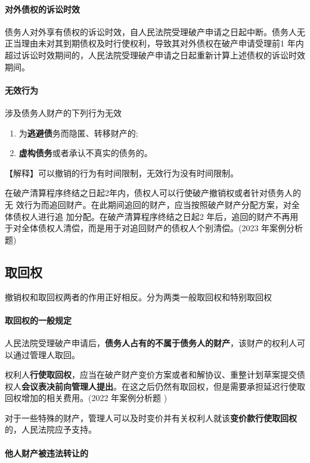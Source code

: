 \documentclass[UTF8,12pt]{ctexart}
\numberwithin{equation}{section} %
\numberwithin{figure}{section}
\numberwithin{table}{section}
\begin{document}
	
	\paragraph{对外债权的诉讼时效}
	债务人对外享有债权的诉讼时效，自人民法院受理破产申请之日起中断。债务人无正当理由未对其到期债权及时行使权利，导致其对外债权在破产申请受理前1 年内超过诉讼时效期间的，人民法院受理破产申请之日起重新计算上述债权的诉讼时效期间。
	
	\paragraph{无效行为}
	涉及债务人财产的下列行为无效
	\begin{enumerate}
		\item 为\textbf{逃避债}务而隐匿、转移财产的; 
		
		\item \textbf{虚构债务}或者承认不真实的债务的。
	\end{enumerate}
	【解释】可以撤销的行为有时间限制，无效行为没有时间限制。
	
	在破产清算程序终结之日起2年内，债权人可以行使破产撤销权或者针对债务人的无 效行为而追回财产。在此期间追回的财产，应当按照破产财产分配方案，对全体债权人进行追 加分配。在破产清算程序终结之日起2 年后，追回的财产不再用于对全体债权人清偿，而是用于对追回财产的债权人个别清偿。(2023 年案例分析题)
	
	\subsection{取回权}
	撤销权和取回权两者的作用正好相反。分为两类一般取回权和特别取回权
	\paragraph{取回权的一般规定}
	人民法院受理破产申请后，\textbf{债务人占有的不属于债务人的财产}，该财产的权利人可以通过管理人取回。
	
	权利人\textbf{行使取回权}，应当在破产财产变价方案或者和解协议、重整计划草案提交债权人\textbf{会议表决前向管理人提出}。在这之后仍然有取回权，但是需要承担延迟行使取回权增加的相关费用。(2022 年案例分析题 )
	
	对于一些特殊的财产，管理人可以及时变价并有关权利人就该\textbf{变价款行使取回权}的，人民法院应予支持。
	
	
	\paragraph{他人财产被违法转让的}
	
\end{document}

